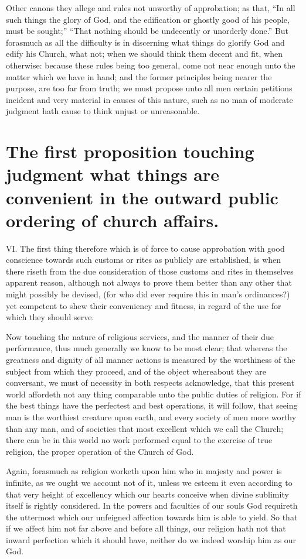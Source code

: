 Other canons they allege and rules not unworthy of approbation; as that, “In all such things the glory of God, and the edification or ghostly good of his people, must be sought;” “That nothing should be undecently or unorderly done.” But forasmuch as all the difficulty is in discerning what things do glorify God and edify his Church, what not; when we should think them decent and fit, when otherwise: because these rules being too general, come not near enough unto the matter which we have in hand; and the former principles being nearer the purpose, are too far from truth; we must propose unto all men certain petitions incident and very material in causes of this nature, such as no man of moderate judgment hath cause to think unjust or unreasonable.


\section*{The first proposition touching judgment what things are convenient in the outward public ordering of church affairs.}
VI. The first thing therefore which is of force to cause approbation with good conscience towards such customs or rites as publicly are established, is when there riseth from the due consideration of those customs and rites in themselves apparent reason, although not always to prove them better than any other that might possibly be devised, (for who did ever require this in man’s ordinances?) yet competent to shew their conveniency and fitness, in regard of the use for which they should serve.

Now touching the nature of religious services, and the manner of their due performance, thus much generally we know to be most clear; that whereas the greatness and dignity  of all manner actions is measured by the worthiness of the subject from which they proceed,
 and of the object whereabout they are conversant, we must of necessity in both respects acknowledge, that this present world affordeth not any thing comparable unto the public duties of religion. For if the best things have the perfectest and best operations, it will follow, that seeing man is the worthiest creature upon earth, and every society of men more worthy than any man, and of societies that most excellent which we call the Church; there can be in this world no work performed equal to the exercise of true religion, the proper operation of the Church of God.

Again, forasmuch as religion worketh upon him who in majesty and power is infinite, as we ought we account not of it, unless we esteem it even according to that very height of excellency which our hearts conceive when divine sublimity itself is rightly considered. In the powers and faculties of our souls God requireth the uttermost which our unfeigned affection towards him is able to yield. So that if we affect him not far above and before all things, our religion hath not that inward perfection which it should have, neither do we indeed worship him as our God.


